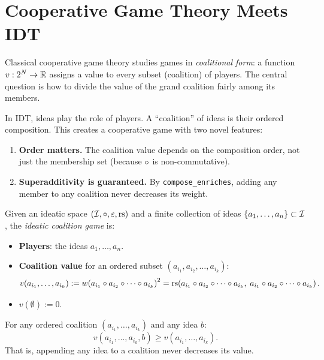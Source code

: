 \section{Cooperative Game Theory Meets IDT}

Classical cooperative game theory studies games in \emph{coalitional form}:
a function $v : 2^N \to \mathbb{R}$ assigns a value to every subset (coalition) of
players.  The central question is how to divide the value of the grand
coalition fairly among its members.

In IDT, ideas play the role of players.  A ``coalition'' of ideas is their
ordered composition.  This creates a cooperative game with two novel features:
\begin{enumerate}
  \item \textbf{Order matters.}  The coalition value depends on the composition
        order, not just the membership set (because $\circ$ is non-commutative).
  \item \textbf{Superadditivity is guaranteed.}  By \texttt{compose\_enriches},
        adding any member to any coalition never decreases its weight.
\end{enumerate}

\begin{definition}
\label{def:ideatic-coalition}
Given an ideatic space $(\mathcal{I}, \circ, \varepsilon, \mathrm{rs})$ and a finite collection
of ideas $\{a_1, \ldots, a_n\} \subset \mathcal{I}$, the \emph{ideatic coalition game}
is:
\begin{itemize}
  \item \textbf{Players}: the ideas $a_1, \ldots, a_n$.
  \item \textbf{Coalition value} for an ordered subset
        $(a_{i_1}, a_{i_2}, \ldots, a_{i_k})$:
        \[
          v(a_{i_1}, \ldots, a_{i_k}) :=
          w\!\left(a_{i_1} \circ a_{i_2} \circ \cdots \circ a_{i_k}\right)^2
          = \mathrm{rs}\!\left(a_{i_1} \circ a_{i_2} \circ \cdots \circ a_{i_k},\;
                       a_{i_1} \circ a_{i_2} \circ \cdots \circ a_{i_k}\right).
        \]
  \item $v(\emptyset) := 0$.
\end{itemize}
\end{definition}

\begin{theorem}
\label{thm:coalition-enrichment-ordered}
For any ordered coalition $(a_{i_1}, \ldots, a_{i_k})$ and any idea $b$:
\[
  v(a_{i_1}, \ldots, a_{i_k}, b) \geq v(a_{i_1}, \ldots, a_{i_k}).
\]
That is, appending any idea to a coalition never decreases its value.
\end{theorem}


